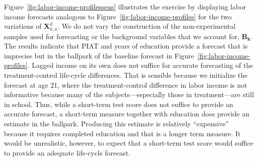 Figure~\ref{fig:labor-income-profilessens} illustrates the exercise by displaying labor income forecasts analogous to Figure~\ref{fig:labor-income-profiles} for the two variations of $\bm{X}_{k,a}^d$. We do not vary the construction of the non-experimental samples used for forecasting or the background variables that we account for, $\bm{B_{k}}$. The results indicate that PIAT and years of education provide a forecast that is imprecise but in the ballpark of the baseline forecast in Figure~\ref{fig:labor-income-profiles}. Lagged income on its own does not suffice for accurate forecasting of the treatment-control life-cycle differences. That is sensible because we initialize the forecast at age 21, where the treatment-control difference in labor income is not informative because many of the subjects---especially those in treatment---are still in school. Thus, while a short-term test score does not suffice to provide an accurate forecast, a short-term measure together with education does provide an estimate in the  ballpark. Producing this estimate is relatively ``expensive'' because it requires completed education and that is a longer term measure. It would be unrealistic, however, to expect that a short-term test score would suffice to provide an adequate life-cycle forecast. 

